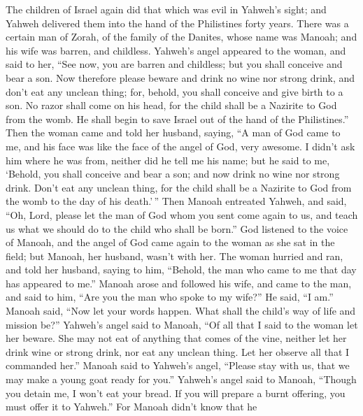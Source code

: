  The children of Israel again did that which was evil in
Yahweh's sight; and Yahweh delivered them into the hand of the
Philistines forty years.  There was a certain man of
Zorah, of the family of the Danites, whose name was Manoah; and his wife
was barren, and childless.  Yahweh's angel appeared to the
woman, and said to her, ``See now, you are barren and childless; but you
shall conceive and bear a son.  Now therefore please
beware and drink no wine nor strong drink, and don't eat any unclean
thing;  for, behold, you shall conceive and give birth to
a son. No razor shall come on his head, for the child shall be a
Nazirite to God from the womb. He shall begin to save Israel out of the
hand of the Philistines.''  Then the woman came and told
her husband, saying, ``A man of God came to me, and his face was like
the face of the angel of God, very awesome. I didn't ask him where he
was from, neither did he tell me his name;  but he said to
me, `Behold, you shall conceive and bear a son; and now drink no wine
nor strong drink. Don't eat any unclean thing, for the child shall be a
Nazirite to God from the womb to the day of his death.'\,''
 Then Manoah entreated Yahweh, and said, ``Oh, Lord,
please let the man of God whom you sent come again to us, and teach us
what we should do to the child who shall be born.''  God
listened to the voice of Manoah, and the angel of God came again to the
woman as she sat in the field; but Manoah, her husband, wasn't with her.
 The woman hurried and ran, and told her husband, saying
to him, ``Behold, the man who came to me that day has appeared to me.''
 Manoah arose and followed his wife, and came to the man,
and said to him, ``Are you the man who spoke to my wife?'' He said, ``I
am.''  Manoah said, ``Now let your words happen. What
shall the child's way of life and mission be?''  Yahweh's
angel said to Manoah, ``Of all that I said to the woman let her beware.
 She may not eat of anything that comes of the vine,
neither let her drink wine or strong drink, nor eat any unclean thing.
Let her observe all that I commanded her.''  Manoah said
to Yahweh's angel, ``Please stay with us, that we may make a young goat
ready for you.''  Yahweh's angel said to Manoah, ``Though
you detain me, I won't eat your bread. If you will prepare a burnt
offering, you must offer it to Yahweh.'' For Manoah didn't know that he
